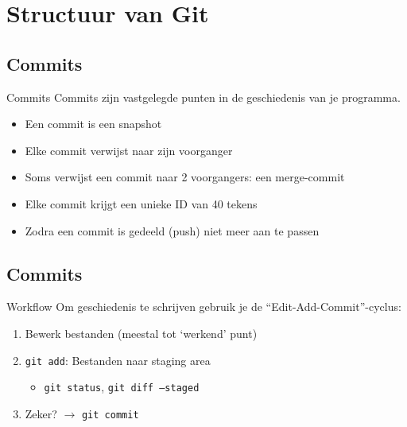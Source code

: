 \section[Structuur]{Structuur van Git}

\subsection{Commits}
\begin{frame}{Commits}
	Commits zijn vastgelegde punten in de geschiedenis van je programma.
	\begin{itemize}
		\item Een commit is een snapshot
		\item Elke commit verwijst naar zijn voorganger
		\item Soms verwijst een commit naar 2 voorgangers: een merge-commit
		\item Elke commit krijgt een unieke ID van 40 tekens
		\item Zodra een commit is gedeeld (push) niet meer aan te passen
	\end{itemize}
\end{frame}

\subsection{Commits}
\begin{frame}{Workflow}
	Om geschiedenis te schrijven gebruik je de ``Edit-Add-Commit''-cyclus:
	\begin{enumerate}
		\item Bewerk bestanden (meestal tot `werkend' punt)
		\item \texttt{git add}: Bestanden naar staging area
		\begin{itemize}
			\item \texttt{git status}, \texttt{git diff --staged}
		\end{itemize}
		\item Zeker? $\rightarrow$ \texttt{git commit}
	\end{enumerate}
\end{frame}
